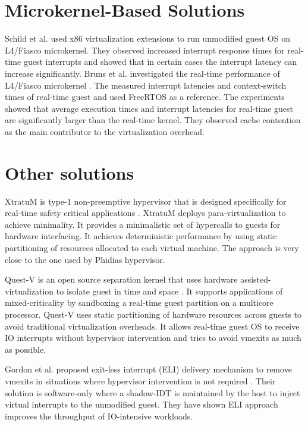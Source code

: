 \section{Microkernel-Based Solutions}
Schild et al. \cite{schild2009faithful} used x86 virtualization extensions to run unmodified guest OS on L4/Fiasco microkernel.
They observed increased interrupt response times for real-time guest interrupts and showed that in certain cases the interrupt latency
can increase significantly.
Bruns et al. investigated the real-time performance of L4/Fiasco microkernel \cite{bruns2010evaluation}.
The measured interrupt latencies and context-switch times of real-time guest and used FreeRTOS \cite{freertos} as a reference.
The experiments showed that average execution times and interrupt latencies for real-time guest are significantly larger than the real-time kernel.
They observed cache contention as the main contributor to the virtualization overhead.


\section{Other solutions}
XtratuM is type-1 non-preemptive hypervisor that is designed specifically for real-time safety critical applications \cite{Carrascosa:2014:XHR:2668138.2668142}.
XtratuM deploys para-virtualization to achieve minimality. It provides a minimalistic set of hypercalls to guests for hardware interfacing.
It achieves deterministic performance by using static partitioning of resources allocated to each virtual machine.
The approach is very close to the one used by Phidias hypervisor.

Quest-V is an open source separation kernel that uses hardware assisted-virtualization to isolate guest in time and space \cite{West:2016:VSK:2966277.2935748}.
It supports applications of mixed-criticality by sandboxing a real-time guest partition on a multicore processor.
Quest-V uses static partitioning of hardware resources across guests to avoid traditional virtualization overheads.
It allows real-time guest OS to receive IO interrupts without hypervisor intervention and tries to avoid vmexits as much as possible.

Gordon et al. proposed exit-less interrupt (ELI) delivery mechanism to remove vmexits in situations where hypervisor intervention is not required \cite{Gordon:2012:EBP:2150976.2151020}.
Their solution is software-only where a shadow-IDT is maintained by the host to inject virtual interrupts to the unmodified guest.
They have shown ELI approach improves the throughput of IO-intensive workloads.

